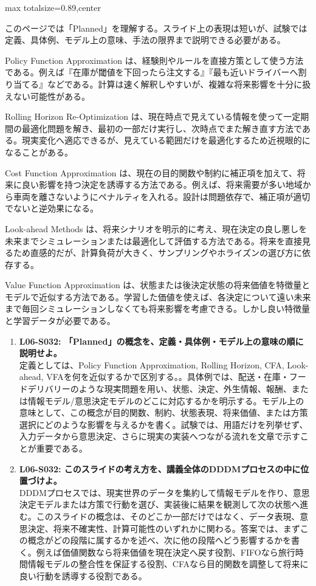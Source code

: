 \begin{minipage}[t]{0.58\textwidth}
\begin{adjustbox}{max totalsize={\textwidth}{0.89\textheight},center}
\begin{minipage}{\textwidth}\scriptsize
{}このページでは「Planned」を理解する。スライド上の表現は短いが、試験では定義、具体例、モデル上の意味、手法の限界まで説明できる必要がある。\par
Policy Function Approximation は、経験則やルールを直接方策として使う方法である。例えば『在庫が閾値を下回ったら注文する』『最も近いドライバーへ割り当てる』などである。計算は速く解釈しやすいが、複雑な将来影響を十分に扱えない可能性がある。\par
Rolling Horizon Re-Optimization は、現在時点で見えている情報を使って一定期間の最適化問題を解き、最初の一部だけ実行し、次時点でまた解き直す方法である。現実変化へ適応できるが、見えている範囲だけを最適化するため近視眼的になることがある。\par
Cost Function Approximation は、現在の目的関数や制約に補正項を加えて、将来に良い影響を持つ決定を誘導する方法である。例えば、将来需要が多い地域から車両を離さないようにペナルティを入れる。設計は問題依存で、補正項が適切でないと逆効果になる。\par
Look-ahead Methods は、将来シナリオを明示的に考え、現在決定の良し悪しを未来までシミュレーションまたは最適化して評価する方法である。将来を直接見るため直感的だが、計算負荷が大きく、サンプリングやホライズンの選び方に依存する。\par
Value Function Approximation は、状態または後決定状態の将来価値を特徴量とモデルで近似する方法である。学習した価値を使えば、各決定について遠い未来まで毎回シミュレーションしなくても将来影響を考慮できる。しかし良い特徴量と学習データが必要である。\par{}\begin{enumerate}\item \textbf{L06-S032: 「Planned」の概念を、定義・具体例・モデル上の意味の順に説明せよ。}\\定義としては、Policy Function Approximation, Rolling Horizon, CFA, Look-ahead, VFAを何を近似するかで区別する。。具体例では、配送・在庫・フードデリバリーのような現実問題を用い、状態、決定、外生情報、報酬、または情報モデル/意思決定モデルのどこに対応するかを明示する。モデル上の意味として、この概念が目的関数、制約、状態表現、将来価値、または方策選択にどのような影響を与えるかを書く。試験では、用語だけを列挙せず、入力データから意思決定、さらに現実の実装へつながる流れを文章で示すことが重要である。\item \textbf{L06-S032: このスライドの考え方を、講義全体のDDDMプロセスの中に位置づけよ。}\\DDDMプロセスでは、現実世界のデータを集約して情報モデルを作り、意思決定モデルまたは方策で行動を選び、実装後に結果を観測して次の状態へ進む。このスライドの概念は、そのどこか一部だけではなく、データ表現、意思決定、将来不確実性、計算可能性のいずれかに関わる。答案では、まずこの概念がどの段階に属するかを述べ、次に他の段階へどう影響するかを書く。例えば価値関数なら将来価値を現在決定へ戻す役割、FIFOなら旅行時間情報モデルの整合性を保証する役割、CFAなら目的関数を調整して将来に良い行動を誘導する役割である。\end{enumerate}

\end{minipage}
\end{adjustbox}
\end{minipage}
